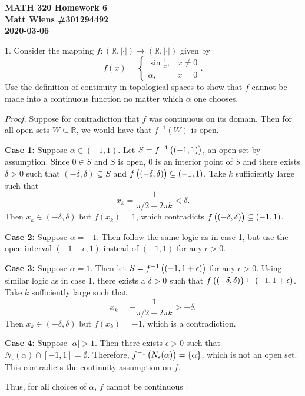 \documentclass{article}
\newcommand{\R}{\mathbb{R}}
\begin{document}
\textbf{MATH 320 Homework 6} \\
\textbf{Matt Wiens \#301294492} \\
\textbf{2020-03-06}

1. Consider the mapping $f: (\R, |\cdot|) \to (\R, |\cdot|)$ given by
%
\begin{equation*}
   f(x)
    = \begin{cases}
        \sin \frac{1}{x}, & x \neq 0 \\
        \alpha, & x = 0
   \end{cases}
   .
\end{equation*}
%
Use the definition of continuity in topological spaces to show that $f$
cannot be made into a continuous function no matter which $\alpha$ one
chooses.

\begin{proof}

Suppose for contradiction that $f$ was continuous on its domain. Then
for all open sets $W \subseteq \R$, we would have that $f^{-1}(W)$ is
open.

\textbf{Case 1:} Suppose $\alpha \in (-1, 1)$. Let $S = f^{-1} \del{(-1,
1)}$, an open set by assumption. Since $0 \in S$ and $S$ is open, $0$ is
an interior point of $S$ and there exists $\delta > 0$ such that
$(-\delta, \delta) \subseteq S$ and $f\del{(-\delta, \delta)} \subseteq
(-1, 1)$. Take $k$ sufficiently large such that
%
\begin{equation*}
    x_k = \frac{1}{\pi / 2 + 2 \pi k} < \delta
    .
\end{equation*}
%
Then $x_k \in (-\delta, \delta)$ but $f(x_k) = 1$, which contradicts
$f\del{(-\delta, \delta)} \subseteq (-1, 1)$.

\textbf{Case 2:} Suppose $\alpha = -1$. Then follow the same logic as in
case 1, but use the open interval $(-1 - \epsilon, 1)$ instead of $(-1,
1)$ for any $\epsilon > 0$.

\textbf{Case 3:} Suppose $\alpha = 1$. Then let $S = f^{-1}\del{(-1, 1 +
\epsilon)}$ for any $\epsilon > 0$. Using similar logic as in case 1,
there exists a $\delta > 0$ such that $f\del{(-\delta, \delta)}
\subseteq (-1, 1 + \epsilon)$. Take $k$ sufficiently large such that
%
\begin{equation*}
    x_k = - \frac{1}{\pi / 2 + 2 \pi k} > - \delta
    .
\end{equation*}
%
Then $x_k \in (-\delta, \delta)$ but $f(x_k) = -1$, which is a
contradiction.

\textbf{Case 4:} Suppose $|\alpha| > 1$. Then there exists $\epsilon >
0$ such that $N_\epsilon(\alpha) \cap [-1, 1] = \emptyset$. Therefore,
$f^{-1}\del{N_\epsilon(\alpha)} = \cbr{\alpha}$, which is not an open
set. This contradicts the continuity assumption on $f$.

Thus, for all choices of $\alpha$, $f$ cannot be continuous

\end{proof}
\end{document}
